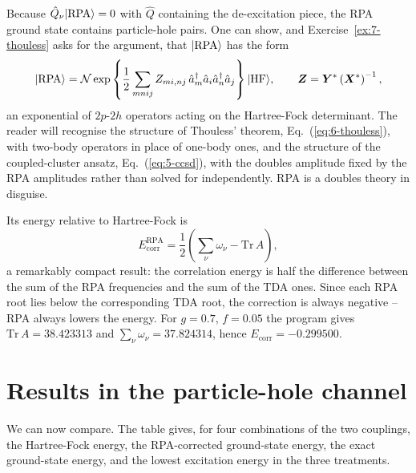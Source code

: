 Because $\hat{Q}_{\nu}\vert \mathrm{RPA} \rangle=0$ with $\hat{Q}$ containing the
de-excitation piece, the RPA ground state contains particle-hole pairs.  One
can show, and Exercise~\ref{ex:7-thouless} asks for the argument, that
$\vert \mathrm{RPA} \rangle$ has the form
\begin{equation}
  \vert \mathrm{RPA} \rangle
   = \mathcal{N}\exp\left\{\frac{1}{2}\sum_{mnij}
     Z_{mi,nj}\,\hat{a}^{\dagger}_{m}\hat{a}_{i}
       \hat{a}^{\dagger}_{n}\hat{a}_{j}\right\}\vert \mathrm{HF} \rangle,
  \qquad
  \bm{Z} = \bm{Y}^{*}\left(\bm{X}^{*}\right)^{-1},
  \label{eq:7-rpagroundstate}
\end{equation}
an exponential of $2p$-$2h$ operators acting on the Hartree-Fock determinant.
The reader will recognise the structure of Thouless' theorem,
Eq.~(\ref{eq:6-thouless}), with two-body operators in place of one-body ones,
and the structure of the coupled-cluster ansatz,
Eq.~(\ref{eq:5-ccsd}), with the doubles amplitude fixed by the RPA amplitudes
rather than solved for independently.  RPA is a doubles theory in disguise.

Its energy relative to Hartree-Fock is
\begin{equation}
  E^{\mathrm{RPA}}_{\mathrm{corr}}
   = \frac{1}{2}\left(\sum_{\nu}\omega_{\nu} - \mathrm{Tr}\,A\right),
  \label{eq:7-rpacorrelation}
\end{equation}
a remarkably compact result: the correlation energy is half the difference
between the sum of the RPA frequencies and the sum of the TDA ones.  Since
each RPA root lies below the corresponding TDA root, the correction is always
negative -- RPA always lowers the energy.  For $g=0.7$, $f=0.05$ the program
gives $\mathrm{Tr}\,A=38.423313$ and $\sum_{\nu}\omega_{\nu}=37.824314$, hence
$E_{\mathrm{corr}}=-0.299500$.

\section{Results in the particle-hole channel}
\label{sec:phresults}

We can now compare.  The table gives, for four combinations of the two
couplings, the Hartree-Fock energy, the RPA-corrected ground-state energy, the
exact ground-state energy, and the lowest excitation energy in the three
treatments.

